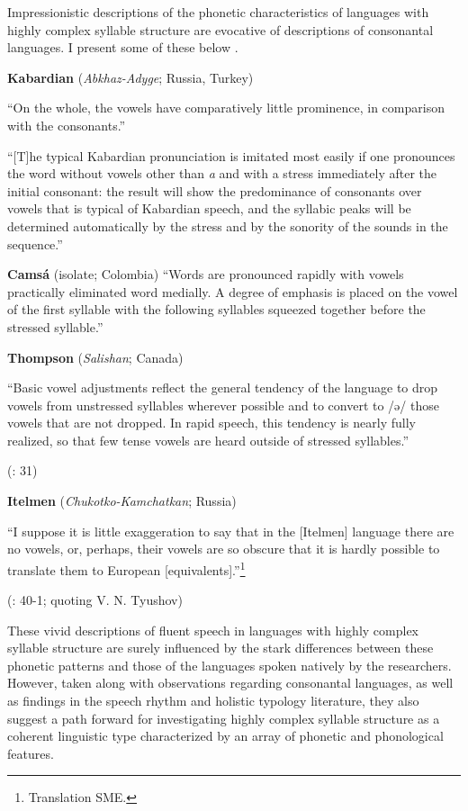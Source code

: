   Impressionistic descriptions of the phonetic characteristics of languages with highly complex syllable structure are evocative of descriptions of consonantal languages. I present some of these below .

\ea\label{ex:1.19}
  \textbf{Kabardian} (\textit{Abkhaz-Adyge}; Russia, Turkey)

“On the whole, the vowels have comparatively little prominence, in comparison with the consonants.”
\citep[24]{Kuipers1960}

“[T]he typical Kabardian pronunciation is imitated most easily if one pronounces the word without vowels other than \textit{a} and with a stress immediately after the initial consonant: the result will show the predominance of consonants over vowels that is typical of Kabardian speech, and the syllabic peaks will be determined automatically by the stress and by the sonority of the sounds in the sequence.” 
\citep[43]{Kuipers1960}
\z

\ea\label{ex:1.20}
  \textbf{Camsá} (isolate; Colombia)
“Words are pronounced rapidly with vowels practically eliminated word medially. A degree of emphasis is placed on the vowel of the first syllable with the following syllables squeezed together before the stressed syllable.” 
\z
\citep[86-7]{Howard1967}

\ea\label{ex:1.21}
  \textbf{Thompson} (\textit{Salishan}; Canada)

“Basic vowel adjustments reflect the general tendency of the language to drop vowels from unstressed syllables wherever possible and to convert to /ə/ those vowels that are not dropped. In rapid speech, this tendency is nearly fully realized, so that few tense vowels are heard outside of stressed syllables.”

(\citealt{ThompsonThompson1992}: 31)
\z

\ea\label{ex:1.22}
  \textbf{Itelmen} (\textit{Chukotko-Kamchatkan}; Russia)

“I suppose it is little exaggeration to say that in the [Itelmen] language there are no vowels, or, perhaps, their vowels are so obscure that it is hardly possible to translate them to European [equivalents].”\footnote{{Translation SME.}}

(\citealt{Volodin1976}: 40-1; quoting V. N. Tyushov)
\z

  These vivid descriptions of fluent speech in languages with highly complex syllable structure are surely influenced by the stark differences between these phonetic patterns and those of the languages spoken natively by the researchers. However, taken along with observations regarding consonantal languages, as well as findings in the speech rhythm and holistic typology literature, they also suggest a path forward for investigating highly complex syllable structure as a coherent linguistic type characterized by an array of phonetic and phonological features.

